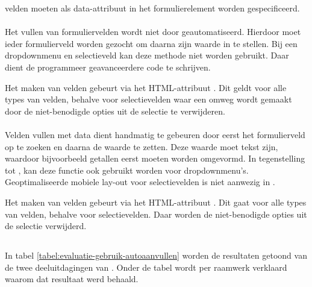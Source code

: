  velden moeten als data-attribuut in het formulierelement worden gespecificeerd.

\paragraph{\jqm}
Het vullen van formuliervelden wordt niet door \jqm{} geautomatiseerd.
Hierdoor moet ieder formulierveld worden gezocht om daarna zijn waarde in te stellen.
Bij een dropdownmenu en selectieveld kan deze methode niet worden gebruikt.
Daar dient de programmeer geavanceerdere code te schrijven.

Het  maken van velden gebeurt via het HTML-attribuut .
Dit geldt voor alle types van velden, behalve voor selectievelden waar een omweg wordt gemaakt door de niet-benodigde opties uit de selectie te verwijderen.

\paragraph{\lungo}
Velden vullen met data dient handmatig te gebeuren door eerst het formulierveld op te zoeken en daarna de waarde te zetten.
Deze waarde moet tekst zijn, waardoor bijvoorbeeld getallen eerst moeten worden omgevormd.
In tegenstelling tot \jqm{}, kan deze functie ook gebruikt worden voor dropdownmenu's.
Geoptimaliseerde mobiele lay-out voor selectievelden is niet aanwezig in \lungo.

Het  maken van velden gebeurt via het HTML-attribuut .
Dit gaat voor alle types van velden, behalve voor selectievelden.
Daar worden de niet-benodigde opties uit de selectie verwijderd.


\subsection{}
\label{sec:evaluatie-gebruik-autoaanvullen}

In tabel \ref{tabel:evaluatie-gebruik-autoaanvullen} worden de resultaten getoond van de twee deeluitdagingen van .
Onder de tabel wordt per raamwerk verklaard waarom dat resultaat werd behaald.

